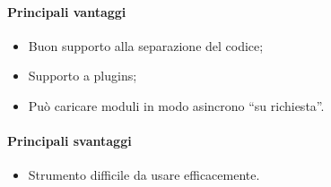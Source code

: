 \documentclass[../PianoDiQualifica.tex]{subfiles}
\begin{document}
			\paragraph{Principali vantaggi}
			\begin{itemize}
					\item Buon supporto alla separazione del codice;
					\item Supporto a plugins;
					\item Può caricare moduli in modo asincrono ``su richiesta''.
				\end{itemize}
			\paragraph{Principali svantaggi}
				\begin{itemize}
					\item Strumento difficile da usare efficacemente.
				\end{itemize}
\end{document}
